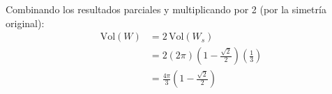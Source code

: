 Combinando los resultados parciales y multiplicando por 2 (por la simetría original):
\begin{align*}
    \text{Vol}(W) &= 2 \, \text{Vol}(W_s) \\
    &= 2 \left( 2\pi \right) \left( 1 - \frac{\sqrt{2}}{2} \right) \left( \frac{1}{3} \right) \\
    &= \frac{4\pi}{3} \left( 1 - \frac{\sqrt{2}}{2} \right)
\end{align*}